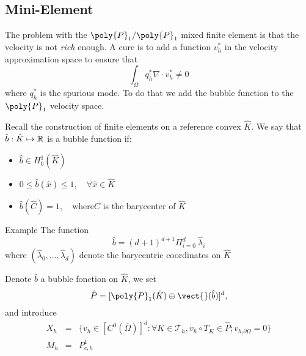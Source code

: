\subsection{Mini-Element}
\label{sec:finite-elem-stok}

  The problem with the $\poly{P}_1/\poly{P}_1$ mixed finite element is that the
  velocity is not \emph{rich} enough. A cure is to add a function $v_h^*$ in the
  velocity approximation space to ensure that
  \begin{equation}
    \label{eq:chmixte:30}
    \int_\Omega q^*_h \nabla \cdot v_h^* \neq 0
  \end{equation}
  where $q_h^*$ is the spurious mode. To do that we add the bubble function to
  the $\poly{P}_1$ velocity space.
  \begin{definition}
    \label{def:chmixte:3}
    Recall the construction of finite elements on a reference convex $\hat{K}$.
    We say that $\hat{b}: \hat{K} \mapsto \mathbb R^{}$ is a bubble function if:
    \begin{itemize}
    \item $\hat{b} \in H^1_0(\hat{K})
$
    \item $0 \leq \hat{b}(\hat{x}) \leq 1, \quad \forall \hat{x} \in \hat{K}$
    \item $\hat{b}(\hat{C}) = 1, \quad \mbox{where} \hat{C}$ is the barycenter of $\hat{K}$
    \end{itemize}
  \end{definition}


  \begin{exampleblock}{Example}
    The function
    \begin{equation}
      \label{eq:chmixte:31}
      \hat{b} = (d+1)^{d+1} \Pi_{i=0}^d\ \hat{\lambda}_i
    \end{equation}
    where $(\hat{\lambda}_0, \ldots, \hat{\lambda}_d)$ denote the barycentric
    coordinates on $\hat{K}$
  \end{exampleblock}


  Denote $\hat{b}$ a bubble fonction on $\hat{K}$, we set
  \begin{equation}
    \label{eq:chmixte:32}
    \hat{P} = [\poly{P}_1(\hat{K}) \oplus \vect{} (\hat{b})]^d,
  \end{equation}
  and introduce
  \begin{eqnarray}
    \label{eq:chmixte:33}
    X_h &=& \Big\{ v_h \in [C^0(\bar{\Omega})]^d : \forall K \in \mathcal{T}_h, v_h
    \circ T_K \in \hat{P}; v_{h_|{\partial \Omega}} = 0 \Big\}\\
    M_h &=& P^1_{c,h}
  \end{eqnarray}

